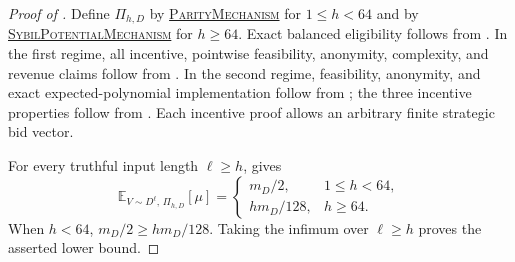 \documentclass[11pt]{article}
\begin{document}
\begin{proof}[Proof of ]
Define $\Pi_{h,D}$ by
\hyperref[alg:parity-mechanism]{\textsc{ParityMechanism}} for $1\le h<64$
and by
\hyperref[alg:sybil-potential-mechanism]{\textsc{SybilPotentialMechanism}}
for $h\ge64$.  Exact balanced eligibility follows from
.  In the first regime, all incentive, pointwise
feasibility, anonymity, complexity, and revenue claims follow from
.  In the second regime, feasibility, anonymity,
and exact expected-polynomial implementation follow from
; the three incentive properties follow from
.  Each incentive proof allows
an arbitrary finite strategic bid vector.

For every truthful input length $\ell\ge h$,
 gives
\[
\mathbb{E}_{V\sim D^\ell,\,\Pi_{h,D}}[\mu]
=
\begin{cases}
m_D/2,&1\le h<64,\\[1ex]
h m_D/128,&h\ge64.
\end{cases}
\]
When $h<64$, $m_D/2\ge h m_D/128$.  Taking the infimum over $\ell\ge h$
proves the asserted lower bound.
\end{proof}



\end{document}
